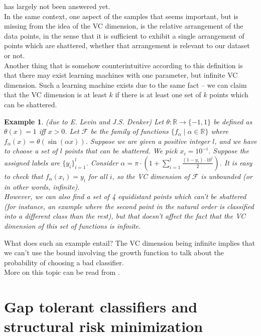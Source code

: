 \documentclass[11pt]{article}
\newcommand{\nl}{\vspace*{0.3cm}\\}
\newcounter{topic} \setcounter{topic}{0}
\newtheorem{example}[theorem]{Example}
\begin{document}
has largely not been answered yet.\nl
In the same context, one aspect of the samples that seems important, but is missing from the idea of the VC dimension, is the relative arrangement of the data points, in the sense that it is
sufficient to exhibit a single arrangement of points which are shattered, whether that arrangement is relevant to our dataset or not.\nl
Another thing that is somehow counterintuitive according to this definition is that there may exist learning machines with one parameter, but infinite VC dimension. Such a learning machine exists
due to the same fact -- we can claim that the VC dimension is at least $k$ if there is at least one set of $k$ points which can be shattered.
\begin{example}
    (due to E. Levin and J.S. Denker) Let $\theta : \mathbb{R} \to \{-1, 1\}$ be defined as $\theta(x) = 1$ iff $x > 0$. Let $\mathcal{F}$ be the family of functions $\{f_\alpha \mid \alpha \in
    \mathbb{R}\}$ where $f_\alpha(x) = \theta(\sin(\alpha x))$. Suppose we are given a positive integer $l$, and we have to choose a set of $l$ points that can be shattered. We pick $x_i =
    10^{-i}$. Suppose the assigned labels are $\{y_i\}_{i = 1}^l$. Consider $\alpha = \pi \cdot \left(1 + \sum_{i = 1}^l \frac{(1 - y_i) \cdot 10^i}{2} \right)$. It is easy to check that
    $f_\alpha(x_i) = y_i$ for all $i$, so the VC dimension of $\mathcal{F}$ is unbounded (or in other words, infinite).\nl
    However, we can also find a set of 4 equidistant points which can't be shattered (for instance, an example where the second point in the natural order is classified into a different class than
    the rest), but that doesn't affect the fact that the VC dimension of this set of functions is infinite.
\end{example}
What does such an example entail? The VC dimension being infinite implies that we can't use the bound involving the growth function to talk about the probability of choosing a bad
classifier.\nl
More on this topic can be read from \cite{burges}.
\newpage
\section{Gap tolerant classifiers and structural risk minimization}
\end{document}
